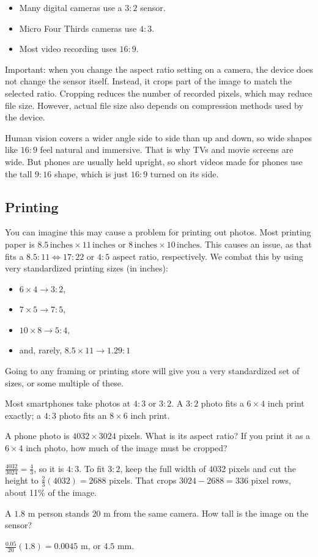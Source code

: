 \begin{itemize}
    \item Many digital cameras use a $3:2$ sensor.
    \item Micro Four Thirds cameras use $4:3$.
    \item Most video recording uses $16:9$.
\end{itemize}

Important: when you change the aspect ratio setting on a camera, the device does not change the sensor itself. Instead, it crops part of the image to match the selected ratio. Cropping reduces the number of recorded pixels, which may reduce file size. However, actual file size also depends on compression methods used by the device.

Human vision covers a wider angle side to side than up and down, so wide
shapes like $16:9$ feel natural and immersive. That is why TVs and movie
screens are wide. But phones are usually held upright, so short videos made
for phones use the tall $9:16$ shape, which is just $16:9$ turned on its
side.

\subsection{Printing}
You can imagine this may cause a problem for printing out photos. Most printing paper is $8.5 \, \mathrm{ inches} \times 11 \, \mathrm{ inches}$ or $8 \, \mathrm{inches} \times 10 \, \mathrm{inches}$. This causes an issue, as that fits a $8.5 : 11 \iff 17 : 22$  or $4:5$ aspect ratio, respectively.
We combat this by using very standardized printing sizes (in inches):
\begin{itemize}
    \item $6 \times 4 \rightarrow 3:2$,
    \item $7 \times 5 \rightarrow 7:5$,
    \item $10\times8 \rightarrow 5:4$,
    \item and, rarely, $8.5 \times 11 \rightarrow 1.29:1$
\end{itemize}
Going to any framing or printing store will give you a very standardized set of sizes, or some multiple of these.

Most smartphones take photos at $4:3$ or $3:2$. A $3:2$ photo fits a
$6 \times 4$ inch print exactly; a $4:3$ photo fits an $8 \times 6$ inch
print.

\begin{Exercise}[title={Will it fit?}, label=cam_print]
A phone photo is $4032 \times 3024$ pixels. What is its aspect ratio? If
you print it as a $6 \times 4$ inch photo, how much of the image must be
cropped?
\end{Exercise}
\begin{Answer}[ref=cam_print]
$\frac{4032}{3024} = \frac{4}{3}$, so it is $4:3$. To fit $3:2$, keep the full
width of 4032 pixels and cut the height to $\frac{2}{3}(4032) = 2688$
pixels. That crops $3024 - 2688 = 336$ pixel rows, about 11\% of the
image.
\end{Answer}

\begin{Exercise}[title={Taller Person}, label=cam3]
A $1.8$ m person stands $20$ m from the same camera. How tall is the image on the sensor?
\end{Exercise}
\begin{Answer}[ref=cam3]
$\frac{0.05}{20}(1.8) = 0.0045$ m, or $4.5$ mm.
\end{Answer}
